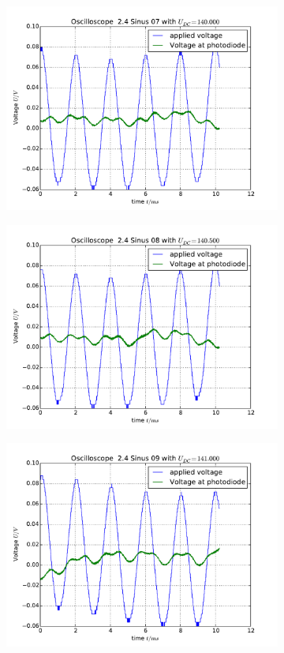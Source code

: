 \begin{figure}
\begin{subfigure}[b]{\picwidth}
        \includegraphics[width=\textwidth]{analysis/figures/24sinus07}
        \caption{}
    \end{subfigure}
    \begin{subfigure}[b]{\picwidth}
        \includegraphics[width=\textwidth]{analysis/figures/24sinus08}
        \caption{}
    \end{subfigure}
    \begin{subfigure}[b]{\picwidth}
        \includegraphics[width=\textwidth]{analysis/figures/24sinus09}

\end{subfigure}
\end{figure}

